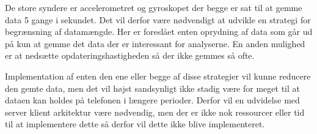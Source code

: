 De store syndere er accelerometret og gyroskopet der begge er sat til at gemme data 5 gange i sekundet.
Det vil derfor være nødvendigt at udvikle en strategi for begrænsning af datamængde.
Her er foreslået enten oprydning af data som går ud på kun at gemme det data der er interessant for analyserne.
En anden mulighed er at nedsætte opdateringshastigheden så der ikke gemmes så ofte.

Implementation af enten den ene eller begge af disse strategier vil kunne reducere den gemte data, men det vil højst sandsynligt ikke stadig være for meget til at dataen kan holdes på telefonen i længere perioder.
Derfor vil en udvidelse med server klient arkitektur være nødvendig, men der er ikke nok ressourcer eller tid til at implementere dette så derfor vil dette ikke blive implementeret.
